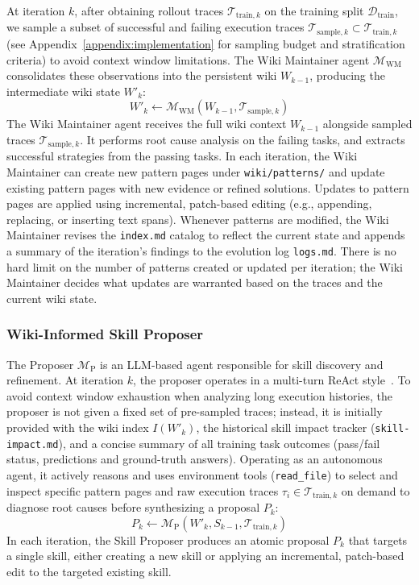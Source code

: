 \documentclass[11pt, a4paper, copyright, gr]{google}
\begin{document}
At iteration $k$, after obtaining rollout traces $\mathcal{T}_{\text{train}, k}$ on the training split $\mathcal{D}_{\text{train}}$, we sample a subset of successful and failing execution traces $\mathcal{T}_{\text{sample}, k} \subset \mathcal{T}_{\text{train}, k}$ (see Appendix~\ref{appendix:implementation} for sampling budget and stratification criteria) to avoid context window limitations. The Wiki Maintainer agent $\mathcal{M}_{\text{WM}}$ consolidates these observations into the persistent wiki $W_{k-1}$, producing the intermediate wiki state $W'_k$:
\begin{equation}
W'_k \leftarrow \mathcal{M}_{\text{WM}}(W_{k-1}, \mathcal{T}_{\text{sample}, k})
\end{equation}
The Wiki Maintainer agent receives the full wiki context $W_{k-1}$ alongside sampled traces $\mathcal{T}_{\text{sample}, k}$. It performs root cause analysis on the failing tasks, and extracts successful strategies from the passing tasks. In each iteration, the Wiki Maintainer can create new pattern pages under \texttt{wiki/patterns/} and update existing pattern pages with new evidence or refined solutions. Updates to pattern pages are applied using incremental, patch-based editing (e.g., appending, replacing, or inserting text spans). Whenever patterns are modified, the Wiki Maintainer revises the \texttt{index.md} catalog to reflect the current state and appends a summary of the iteration's findings to the evolution log \texttt{logs.md}. There is no hard limit on the number of patterns created or updated per iteration; the Wiki Maintainer decides what updates are warranted based on the traces and the current wiki state.

\subsubsection{Wiki-Informed Skill Proposer}
\label{subsubsec:proposer}

The Proposer $\mathcal{M}_{\text{P}}$ is an LLM-based agent responsible for skill discovery and refinement. At iteration $k$, the proposer operates in a multi-turn ReAct style~\citep{yao2022react}. To avoid context window exhaustion when analyzing long execution histories, the proposer is not given a fixed set of pre-sampled traces; instead, it is initially provided with the wiki index $I(W'_k)$, the historical skill impact tracker (\texttt{skill-impact.md}), and a concise summary of all training task outcomes (pass/fail status, predictions and ground-truth answers). Operating as an autonomous agent, it actively reasons and uses environment tools (\texttt{read\_file}) to select and inspect specific pattern pages and raw execution traces $\tau_i \in \mathcal{T}_{\text{train}, k}$ on demand to diagnose root causes before synthesizing a proposal $P_k$:
\begin{equation}
P_k \leftarrow \mathcal{M}_{\text{P}}(W'_k, S_{k-1}, \mathcal{T}_{\text{train}, k})
\end{equation}
In each iteration, the Skill Proposer produces an atomic proposal $P_k$ that targets a single skill, either creating a new skill or applying an incremental, patch-based edit to the targeted existing skill.
\end{document}
